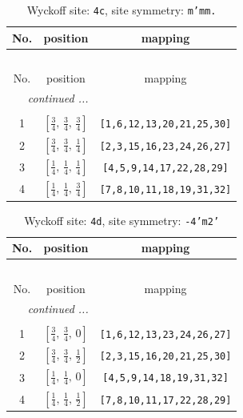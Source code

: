 \documentclass[fleqn,8pt]{jsarticle}
\begin{document}
\renewcommand{\arraystretch}{1.2}
\begin{longtable}{ccc}
\caption{Wyckoff site: {\tt 4c}, site symmetry: {\tt m'mm.}}
 \\
 \hline \hline
No. & position & mapping \\ \hline \endfirsthead

\multicolumn{2}{l}{\tablename\ \thetable{}} \\
 \hline \hline
No. & position & mapping \\ \hline \endhead

 \hline \hline
\multicolumn{2}{r}{\footnotesize\it continued ...} \\ \endfoot

 \hline \hline
\multicolumn{2}{r}{} \\ \endlastfoot

1 & $\left[ \frac{3}{4},\, \frac{3}{4},\, \frac{3}{4} \right]$ & {\tt [1,6,12,13,20,21,25,30]} \\ \hline
2 & $\left[ \frac{3}{4},\, \frac{3}{4},\, \frac{1}{4} \right]$ & {\tt [2,3,15,16,23,24,26,27]} \\ \hline
3 & $\left[ \frac{1}{4},\, \frac{1}{4},\, \frac{1}{4} \right]$ & {\tt [4,5,9,14,17,22,28,29]} \\ \hline
4 & $\left[ \frac{1}{4},\, \frac{1}{4},\, \frac{3}{4} \right]$ & {\tt [7,8,10,11,18,19,31,32]} \\
\end{longtable}
\renewcommand{\arraystretch}{1.2}
\begin{longtable}{ccc}
\caption{Wyckoff site: {\tt 4d}, site symmetry: {\tt -4'm2'}}
 \\
 \hline \hline
No. & position & mapping \\ \hline \endfirsthead

\multicolumn{2}{l}{\tablename\ \thetable{}} \\
 \hline \hline
No. & position & mapping \\ \hline \endhead

 \hline \hline
\multicolumn{2}{r}{\footnotesize\it continued ...} \\ \endfoot

 \hline \hline
\multicolumn{2}{r}{} \\ \endlastfoot

1 & $\left[ \frac{3}{4},\, \frac{3}{4},\, 0 \right]$ & {\tt [1,6,12,13,23,24,26,27]} \\ \hline
2 & $\left[ \frac{3}{4},\, \frac{3}{4},\, \frac{1}{2} \right]$ & {\tt [2,3,15,16,20,21,25,30]} \\ \hline
3 & $\left[ \frac{1}{4},\, \frac{1}{4},\, 0 \right]$ & {\tt [4,5,9,14,18,19,31,32]} \\ \hline
4 & $\left[ \frac{1}{4},\, \frac{1}{4},\, \frac{1}{2} \right]$ & {\tt [7,8,10,11,17,22,28,29]} \\
\end{longtable}
\end{document}

